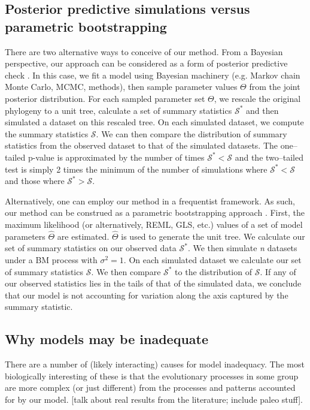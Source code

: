 \documentclass[a4paper,12pt]{article}
\begin{document}
\subsection*{Posterior predictive simulations versus parametric bootstrapping}
There are two alternative ways to conceive of our method. From a Bayesian perspective, our approach can be considered as a form of posterior predictive check \citep{Rubin1984, Gelman1996, Gelmanbook}. In this case, we fit a model using Bayesian machinery (e.g. Markov chain Monte Carlo, MCMC, methods), then sample parameter values $\Theta$ from the joint posterior distribution. For each sampled parameter set $\Theta$, we rescale the original phylogeny to a unit tree, calculate a set of summary statistics $\mathcal{S}^*$ and then simulated a dataset on this rescaled tree. On each simulated dataset, we compute the summary statistics $\mathcal{S}$. We can then compare the distribution of summary statistics from the observed dataset to that of the simulated datasets. The one--tailed p-value is approximated by the number of times $\mathcal{S}^* < \mathcal{S}$ and the two--tailed test is simply 2 times the minimum of the number of simulations where $\mathcal{S}^* < \mathcal{S}$ and those where $\mathcal{S}^* > \mathcal{S}$.

Alternatively, one can employ our method in a frequentist framework. As such, our method can be construed as a parametric bootstrapping approach \citep{Efronbootstrap}. First, the maximum likelihood (or alternatively, REML, GLS, etc.) values of a set of model parameters $\hat{\Theta}$ are estimated. $\hat{\Theta}$ is used to  generate the unit tree. We calculate our set of summary statistics on our observed data $\mathcal{S}^*$. We then simulate \textit{n} datasets under a BM process with $\sigma^2 = 1$. On each simulated dataset we calculate our set of summary statistics $\mathcal{S}$. We then compare $\mathcal{S}^*$ to the distribution of $\mathcal{S}$. If any of our observed statistics lies in the tails of that of the simulated data, we conclude that our model is not accounting for variation along the axis captured by the summary statistic.


\subsection*{Why models may be inadequate}
There are a number of (likely interacting) causes for model inadequacy. The most biologically interesting of these is that the evolutionary processes in some group are more complex (or just different) from the processes and patterns accounted for by our model. [talk about real results from the literature; include paleo stuff]. 
\end{document}
